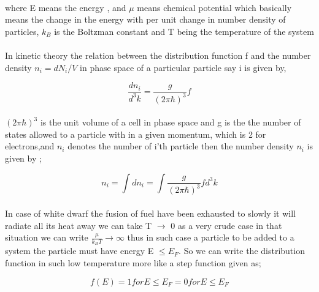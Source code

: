 \documentclass{report}
\begin{document}
\paragraph{ }
where E means the energy , and $\mu$ means chemical potential which basically means the change in the energy with per unit change in number density of particles, $k_B$ is the Boltzman constant and T being the temperature of the system
\paragraph{}
In kinetic theory the relation between the distribution function f and the number density $n_i = dN_i /V$ in phase space of a particular  particle say i is given by,
\begin{center}
\begin{equation}
\frac{dn_i}{d^3 k} = \frac{g}{\left(2\pi\hbar\right) ^3} f
\label{10}
\end{equation}
\end{center}
\paragraph{ }
$\left( 2\pi \hbar \right)^3$ is the unit volume of a cell in phase space and g is the the number of states allowed to a particle with in a given momentum, which is 2 for electrons,and $n_i$ denotes the number of i'th particle then the number density $n_i$ is given by ;
\begin{center}
\begin{equation}
n_i = \int dn_i = \int \frac{g}{\left( 2\pi\hbar \right)^3} f d^3 k
\label{11}
\end{equation}
\end{center} 
\paragraph{ }
In case of white dwarf the fusion of fuel have been exhausted to slowly it will radiate all its heat away we can take T $\rightarrow$ 0 as a very crude case in that situation we can write $\frac{\mu}{k_B T} \rightarrow \infty $ thus in such case a particle to be added to a system the particle must have energy E $\leq E_F$. So we can write the distribution function in such low temperature more like a step function given as;
\begin{center}
\begin{equation}
f(E) =  1   for   E\leq E_F 
    = 0  for   E\leq E_F
\label{12}
\end{equation}
\end{center}
\newpage
\end{document}
